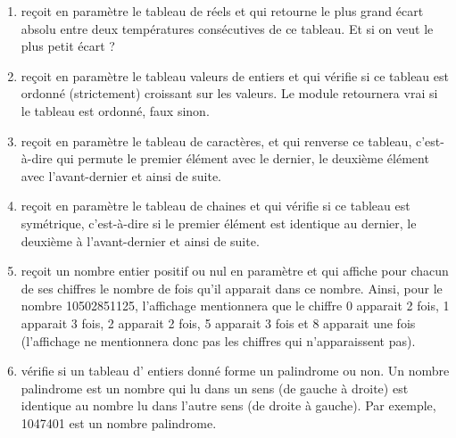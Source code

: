 \documentclass[11pt,a4paper]{article}
\begin{document}
					\begin{enumerate}
				
			\item  re\c coit en param\`etre le tableau  de 
              \verb@n@  r\'eels et qui retourne
              le plus grand \'ecart absolu entre deux temp\'eratures cons\'ecutives de ce tableau. Et si on veut
              le plus petit \'ecart ?
            
			\item 
              re\c coit en param\`etre le tableau valeurs de \verb@n@ entiers et qui v\'erifie si ce
              tableau est ordonn\'e (strictement) croissant sur les valeurs. Le module retournera vrai si le
              tableau est ordonn\'e, faux sinon.
            
			\item 
              re\c coit en param\`etre le tableau \verb@tabCar@ 
              de \verb@n@ caract\`eres, et qui \guillemotleft  renverse \guillemotright 
              ce tableau, c'est-\`a-dire qui permute le premier \'el\'ement avec le dernier, le deuxi\`eme \'el\'ement
              avec l'avant-dernier et ainsi de suite.
              
			\item 
              re\c coit en param\`etre le tableau \verb@tabChaines@ 
              de \verb@n@ chaines et qui v\'erifie
              si ce tableau est sym\'etrique, c'est-\`a-dire si le premier \'el\'ement est identique au dernier, le
              deuxi\`eme \`a l'avant-dernier et ainsi de suite.
            
			\item 
              re\c coit un nombre entier positif ou nul en param\`etre et qui affiche pour
              chacun de ses chiffres le nombre de fois qu'il apparait dans ce nombre. Ainsi, pour le nombre
              10502851125, l'affichage mentionnera que le chiffre 0 apparait 2 fois, 1 apparait 3 fois, 2
              apparait 2 fois, 5 apparait 3 fois et 8 apparait une fois (l'affichage ne mentionnera donc pas
              les chiffres qui n'apparaissent pas).
            
			\item 
              v\'erifie si un tableau d' entiers donn\'e forme un palindrome ou non. Un nombre
              palindrome est un nombre qui lu dans un sens (de gauche \`a droite) est identique au nombre
              lu dans l'autre sens (de droite \`a gauche). Par exemple, 1047401 est un nombre palindrome.
            
					\end{enumerate}
				
\end{document}
